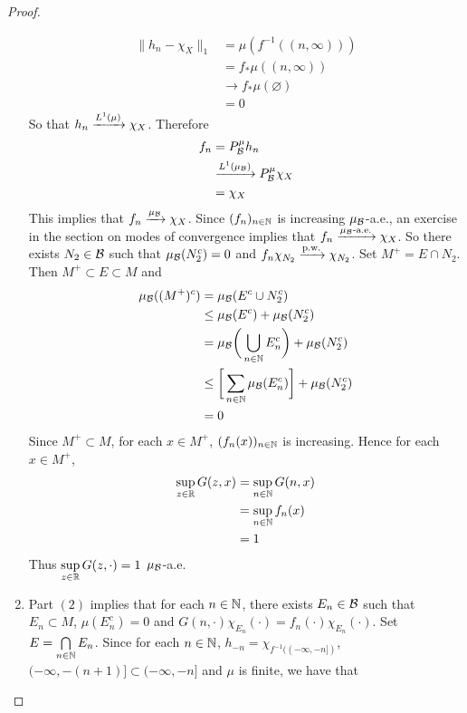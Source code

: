 \documentclass{book}
\begin{document}
\begin{proof}
\begin{enumerate}
			\begin{align*}
				\|h_n - \chi_{X}\|_1
				& = \mu(f^{-1}((n, \infty))) \\
				& = f_* \mu ((n, \infty)) \\
				& \rightarrow f_* \mu(\varnothing) \\
				& = 0 
			\end{align*}
			So that $h_{n} \xrightarrow{L^1(\mu)} \chi_{X}$. Therefore  
			\begin{align*}
				f_n 
				& = P^{\mu}_{\mathcal{B}} h_n \\
				& \xrightarrow{L^1(\mu_{\mathcal{B}})} P^{\mu}_{\mathcal{B}} \chi_{X} \\
				& = \chi_{X}
			\end{align*}
			This implies that $f_n \xrightarrow{\mu_{\mathcal{B}}} \chi_{X}$. Since $(f_n)_{n \in \mathbb{N}}$ is increasing $\mu_{\mathcal{B}}$-a.e., an exercise in the section on modes of convergence implies that $f_n \xrightarrow{\text{$\mu_{\mathcal{B}}$-a.e.}} \chi_{X}$. So there exists $N_2 \in \mathcal{B}$ such that $\mu_{\mathcal{B}}(N_2^c) = 0$ and $f_n \chi_{N_2} \xrightarrow{\text{p.w.}} \chi_{N_2}$. Set $M^+ = E \cap N_2$. Then  $M^+ \subset E \subset M$ and
			\begin{align*}
				\mu_{\mathcal{B}}((M^+)^c)
				& = \mu_{\mathcal{B}}(E^c \cup N_2^c) \\ 
				& \leq \mu_{\mathcal{B}}(E^c) + \mu_{\mathcal{B}}(N_2^c) \\
				& = \mu_{\mathcal{B}} \bigg( \bigcup_{n \in \mathbb{N}} E_n^c \bigg) + \mu_{\mathcal{B}}(N_2^c) \\
				& \leq \bigg[\sum_{n \in \mathbb{N}} \mu_{\mathcal{B}}(E_n^c) \bigg] + \mu_{\mathcal{B}}(N_2^c) \\
				& = 0
			\end{align*}
			Since $M^+ \subset M$, for each $x \in M^+$, $(f_n(x))_{n \in \mathbb{N}}$ is increasing. Hence for each $x \in M^+$,
			\begin{align*}
				\sup\limits_{z \in \mathbb{R}} G(z, x) 
				& = \sup\limits_{n \in \mathbb{N}} G(n, x) \\
				& = \sup\limits_{n \in \mathbb{N}} f_n(x) \\
				& = 1
			\end{align*}
			Thus $\sup\limits_{z \in \mathbb{R}} G(z, \cdot) = 1$ $\mu_{\mathcal{B}}$-a.e.\\
		\item Part $(2)$ implies that for each $n \in \mathbb{N}$, there exists $E_n \in \mathcal{B}$ such that $E_n \subset M$, $\mu(E_n^c) = 0$ and $G(n, \cdot)\chi_{E_n}(\cdot) = f_n(\cdot) \chi_{E_n}(\cdot)$. Set $E = \bigcap\limits_{n \in \mathbb{N}} E_n$. Since for each $n \in \mathbb{N}$, $h_{-n} = \chi_{f^{-1}((-\infty, -n])}$, $(-\infty, -(n + 1)] \subset (-\infty, -n]$ and $\mu$ is finite, we have that 

\end{enumerate}
\end{proof}
\end{document}
